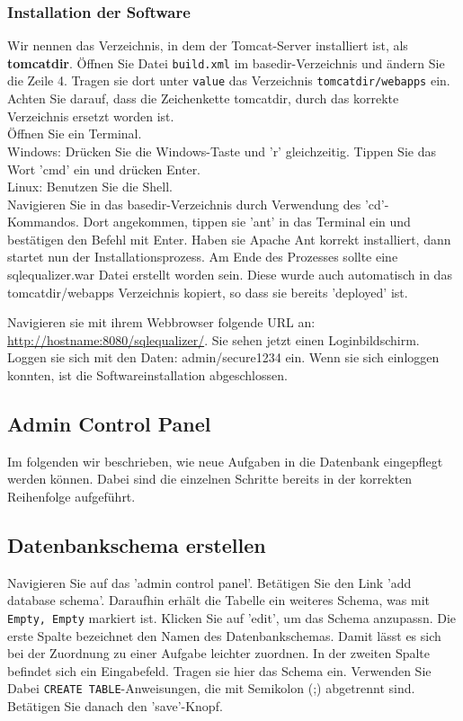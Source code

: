 \subsubsection{Installation der Software}

Wir nennen das Verzeichnis, in dem der Tomcat-Server installiert ist, als \textbf{tomcatdir}.
Öffnen Sie Datei \verb|build.xml| im basedir-Verzeichnis und ändern Sie die Zeile 4. Tragen sie dort unter \verb|value| das Verzeichnis \verb|tomcatdir/webapps| ein. Achten Sie darauf, dass die Zeichenkette tomcatdir, durch das korrekte Verzeichnis ersetzt worden ist.\\

Öffnen Sie ein Terminal.\\
Windows: Drücken Sie die Windows-Taste und 'r' gleichzeitig. Tippen Sie das Wort 'cmd' ein und drücken Enter.\\
Linux: Benutzen Sie die Shell.\\

Navigieren Sie in das basedir-Verzeichnis durch Verwendung des 'cd'-Kommandos. Dort angekommen, tippen sie 'ant' in das Terminal ein und bestätigen den Befehl mit Enter. Haben sie Apache Ant korrekt installiert, dann startet nun der Installationsprozess. Am Ende des Prozesses sollte eine sqlequalizer.war Datei erstellt worden sein. Diese wurde auch automatisch in das tomcatdir/webapps Verzeichnis kopiert, so dass sie bereits 'deployed' ist. 

Navigieren sie mit ihrem Webbrowser folgende URL an: \url{http://hostname:8080/sqlequalizer/}. Sie sehen jetzt einen Loginbildschirm. Loggen sie sich mit den Daten: admin/secure1234 ein. Wenn sie sich einloggen konnten, ist die Softwareinstallation abgeschlossen.

\subsection{Admin Control Panel}

Im folgenden wir beschrieben, wie neue Aufgaben in die Datenbank eingepflegt werden können. Dabei sind die einzelnen Schritte bereits in der korrekten Reihenfolge aufgeführt.

\subsection{Datenbankschema erstellen}

Navigieren Sie auf das 'admin control panel'. Betätigen Sie den Link 'add database schema'. Daraufhin erhält die Tabelle ein weiteres Schema, was mit \verb|Empty, Empty| markiert ist. Klicken Sie auf 'edit', um das Schema anzupassn. Die erste Spalte bezeichnet den Namen des Datenbankschemas. Damit lässt es sich bei der Zuordnung zu einer Aufgabe leichter zuordnen. In der zweiten Spalte befindet sich ein Eingabefeld. Tragen sie hier das Schema ein. Verwenden Sie Dabei \verb|CREATE TABLE|-Anweisungen, die mit Semikolon (;) abgetrennt sind. Betätigen Sie danach den 'save'-Knopf.

